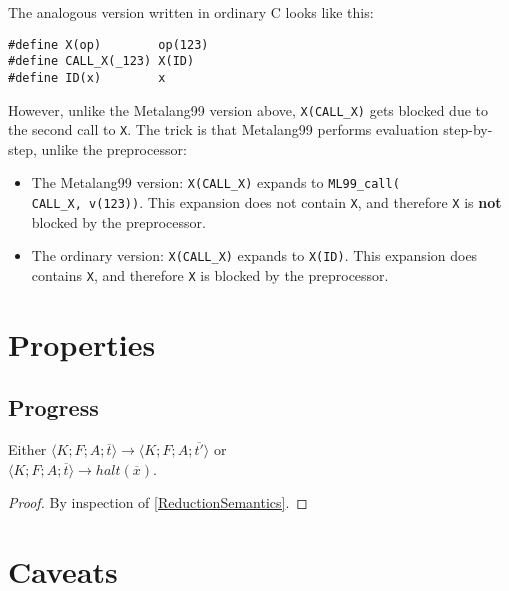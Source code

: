\documentclass[12pt]{article}
\theoremstyle{break}
\begin{document}
The analogous version written in ordinary C looks like this:

\begin{verbatim}
#define X(op)        op(123)
#define CALL_X(_123) X(ID)
#define ID(x)        x
\end{verbatim}

However, unlike the Metalang99 version above, \texttt{X(CALL\_X)} gets blocked \cite{Blueprinting} due to the
second call to \texttt{X}. The trick is that Metalang99 performs evaluation step-by-step,
unlike the preprocessor:

\begin{itemize}
    \item The Metalang99 version: \texttt{X(CALL\_X)} expands to \texttt{ML99\_call(\\ CALL\_X, v(123))}.
    This expansion does not contain \texttt{X}, and therefore \texttt{X} is \textbf{not}
    blocked by the preprocessor.

    \item The ordinary version: \texttt{X(CALL\_X)} expands to \texttt{X(ID)}. This expansion
    does contains \texttt{X}, and therefore \texttt{X} is blocked by the preprocessor.
\end{itemize}

\section{Properties}

\subsection{Progress}

\begin{proposition}[Progress]
Either $\langle K; F; A; \overline{t} \rangle \to \langle K; F; A; \overline{t'} \rangle$ or \\
$\langle K; F; A; \overline{t} \rangle \to halt(\overline{x})$.
\end{proposition}

\begin{proof}
By inspection of \ref{ReductionSemantics}.
\end{proof}

\section{Caveats}
\end{document}
